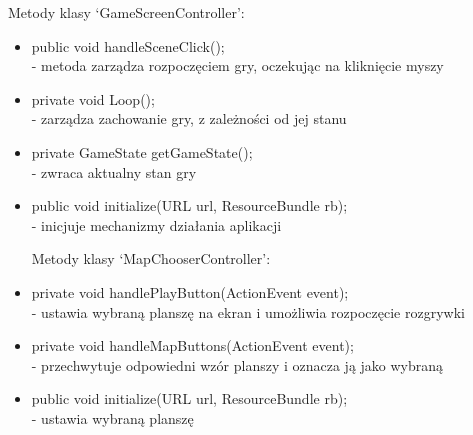 \documentclass[a4paper]{article}
\begin{document}
Metody klasy ‘GameScreenController’:
\begin{itemize}
\item public void handleSceneClick();\\
- metoda zarządza rozpoczęciem gry, oczekując na kliknięcie myszy
    
\item private void Loop();\\
- zarządza zachowanie gry, z zależności od jej stanu
    
\item private GameState getGameState();\\
- zwraca aktualny stan gry

\item public void initialize(URL url, ResourceBundle rb);\\
- inicjuje mechanizmy działania aplikacji

Metody klasy ‘MapChooserController’:

\item private void handlePlayButton(ActionEvent event);\\
- ustawia wybraną planszę na ekran i umożliwia rozpoczęcie rozgrywki

\item private void handleMapButtons(ActionEvent event);\\
- przechwytuje odpowiedni wzór planszy i oznacza ją jako wybraną

\item public void initialize(URL url, ResourceBundle rb);\\
- ustawia wybraną planszę
\end{itemize}
\bigskip 
\end{document}
